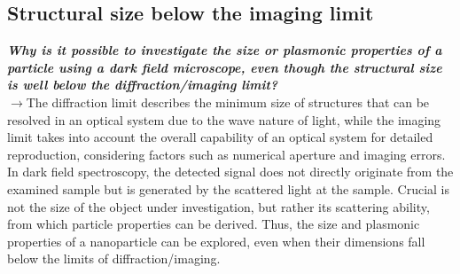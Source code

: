 \subsection{\label{subsec:FZV4}Structural size below the imaging limit}
\textbf{\textit{Why is it possible to investigate the size or plasmonic properties of a 
particle using a dark field microscope, even though the structural size is well below the diffraction/imaging limit?}} \\
$\rightarrow$The diffraction limit describes the minimum size of structures that can be 
resolved in an optical system due to the wave nature of light, while the imaging limit 
takes into account the overall capability of an optical system for detailed reproduction, 
considering factors such as numerical aperture and imaging errors. \\
In dark field spectroscopy, the detected signal does not directly originate from the examined 
sample but is generated by the scattered light at the sample. Crucial is not the size of the 
object under investigation, but rather its scattering ability, from which particle properties 
can be derived. Thus, the size and plasmonic properties of a nanoparticle can be explored, 
even when their dimensions fall below the limits of diffraction/imaging. \\